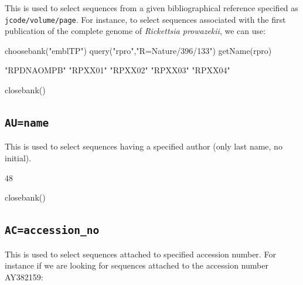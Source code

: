 \documentclass{article}
\begin{document}
This is used to select sequences from a given bibliographical reference specified
as \texttt{jcode/volume/page}. For instance, to select sequences associated
with the first publication \cite{jrl0009} of the complete genome of \textit{Rickettsia prowazekii},
we can use:

\begin{Schunk}
\begin{Sinput}
 choosebank("emblTP")
 query("rpro","R=Nature/396/133")
 getName(rpro)
\end{Sinput}
\begin{Soutput}
[1] "RPDNAOMPB" "RPXX01"    "RPXX02"    "RPXX03"    "RPXX04"   
\end{Soutput}
\begin{Sinput}
 closebank()
\end{Sinput}
\end{Schunk}

\subsection{\texttt{AU=name}}

This is used to select sequences having a specified author (only last name, no initial).

\begin{Schunk}
\begin{Soutput}
[1] 48
\end{Soutput}
\begin{Sinput}
 closebank()
\end{Sinput}
\end{Schunk}

\subsection{\texttt{AC=accession\_no}}

This is used to select sequences attached to specified accession number.
For instance if we are looking for sequences attached to the accession
number AY382159:
\end{document}
